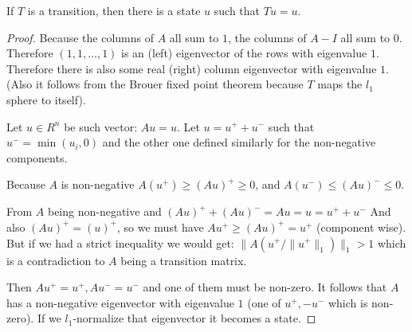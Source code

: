 \begin{lemma}
\label{Ax:lem:exist1}
If $T$ is a transition, then
there is a state $u$ such that $Tu = u$.
\begin{proof}
Because the columns of $A$ all sum to $1$, the columns of $A-I$ all sum to $0$.
Therefore $(1,1, \dots, 1)$ is an (left) eigenvector of the rows with eigenvalue $1$.
Therefore there is also some real (right) column eigenvector with eigenvalue $1$. 
(Also it follows from the Brouer fixed point theorem because $T$ maps the $l_1$
sphere to itself).

Let $u \in R^n$ be such vector: $Au=u$. Let $u = u^+ + u^-$ such that $u^- =
\min(u_i,0)$ and the other one defined similarly for the non-negative components.

Because $A$ is non-negative $A(u^+) \geq (Au)^+ \geq 0$,
and $A(u^-) \leq (Au)^- \leq 0$.

From $A$ being
non-negative and $(Au)^+ + (Au)^- = Au = u = u^+ + u^-$
And also $(A u)^+ = (u)^+$, so we must have $Au^+ \geq (Au)^+ = u^+$ 
(component wise). But if we had a strict inequality we would get:
$\|A(u^+/\|u^+\|_1)\|_1 > 1$ which is a contradiction to $A$ being a transition
matrix.

Then $A u^+ = u^+, A u^- = u^-$ and one of them must be non-zero. It follows
that $A$ has a non-negative eigenvector with eigenvalue $1$ (one of $u^+, -u^-$
which is non-zero). If we $l_1$-normalize that eigenvector it becomes a state.
\end{proof}
\end{lemma}


